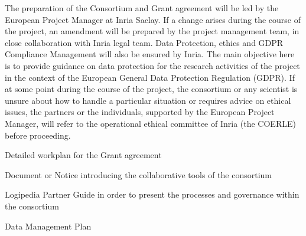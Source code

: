\begin{workpackage}[id=management,type=MGT,wphases=1-48,
  short=Management,
  title=Management,
  lead=Inr,InrRM=34,InnRM=2,SacRM=2,TumRM=2,LieRM=2,BelRM=2,DelRM=2,FauRM=2]
\begin{tasklist}
  \begin{task}[id=legal,title={Legal Management (data, ethics, GDPR)},shorttitle={Legal},
      lead=Inr,InrRM=4,wphases=1-48]
    The preparation of the Consortium and Grant agreement will be led
    by the European Project Manager at Inria Saclay. If a change
    arises during the course of the project, an amendment will be
    prepared by the project management team, in close collaboration
    with Inria legal team.  Data Protection, ethics and GDPR
    Compliance Management will also be ensured by Inria. The main
    objective here is to provide guidance on data protection for the
    research activities of the project in the context of the European
    General Data Protection Regulation (GDPR). If at some point during
    the course of the project, the consortium or any scientist is
    unsure about how to handle a particular situation or requires
    advice on ethical issues, the partners or the individuals,
    supported by the European Project Manager, will refer to the operational ethical
    committee of Inria (the COERLE) before proceeding.
  \end{task}
\end{tasklist}

\begin{wpdelivs}

\begin{wpdeliv}[due=2,id=workplan,dissem=PU,nature=R,lead=Inr,task=coordination]{Detailed workplan for the Grant agreement}\end{wpdeliv}

\begin{wpdeliv}[due=2,id=collab-tools,dissem=PU,nature=R,lead=Inr, task=coordination]{Document or Notice introducing the collaborative tools of the consortium}\end{wpdeliv}

\begin{wpdeliv}[due=3,id=guide,dissem=PU,nature=R,lead=Inr,task=coordination]{Logipedia Partner Guide in order to present the processes and governance within the consortium}\end{wpdeliv}

\begin{wpdeliv}[due=4,id=data-plan,dissem=PU,nature=R,lead=Inr, task=coordination]{Data Management Plan}\end{wpdeliv}

\end{wpdelivs}





\end{workpackage}

